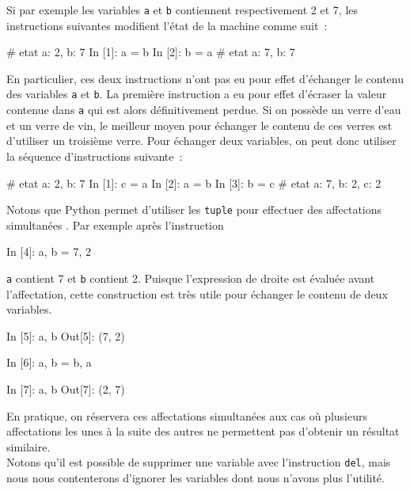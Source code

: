 \documentclass{magnoliaold}
\begin{document}
Si par exemple les variables \verb_a_ et \verb_b_ contiennent respectivement 2 et 7, les
instructions suivantes modifient l'état de la machine comme suit~:

\begin{pythoncode}
# etat {a: 2, b: 7}
In [1]: a = b
In [2]: b = a
# etat {a: 7, b: 7} 
\end{pythoncode}

\noindent En particulier, ces deux instructions n'ont pas eu pour effet d'échanger le contenu
des variables \verb_a_ et \verb_b_. La première instruction a eu pour effet d'écraser la
valeur contenue dans \verb_a_ qui est alors définitivement perdue. Si on possède un verre
d'eau et un verre de vin, le meilleur moyen pour échanger le contenu de ces verres est
d'utiliser un troisième verre. Pour échanger deux variables, on peut donc utiliser la séquence
d'instructions suivante~:

\begin{pythoncode}
# etat {a: 2, b: 7}
In [1]: c = a
In [2]: a = b
In [3]: b = c
# etat {a: 7, b: 2, c: 2}
\end{pythoncode}



Notons que Python permet d'utiliser les \verb_tuple_ pour effectuer des affectations
\og simultanées \fg. Par exemple après l'instruction
\begin{pythoncode}
In [4]: a, b = 7, 2
\end{pythoncode}
\verb!a! contient 7 et \verb!b! contient 2.
Puisque l'expression de droite est évaluée avant l'affectation, cette construction est
très utile pour échanger le contenu de deux variables.
\begin{pythoncode}
In [5]: a, b
Out[5]: (7, 2)

In [6]: a, b = b, a

In [7]: a, b
Out[7]: (2, 7)
\end{pythoncode}
En pratique, on réservera ces affectations simultanées aux cas où plusieurs affectations
les unes à la suite des autres ne permettent pas d'obtenir un résultat similaire.\\

Notons qu'il est possible de supprimer une variable avec l'instruction \verb_del_, mais
nous nous contenterons d'ignorer les variables dont nous n'avons plus l'utilité.\\
\end{document}
